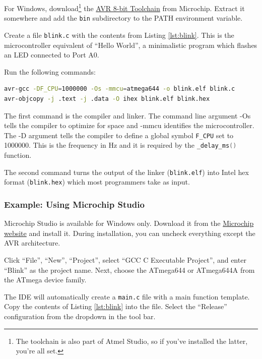 \documentclass{article}
\newcommand{\file}[1]{\texttt{#1}}
\begin{document}
For Windows, download\footnote{The toolchain is also part of Atmel Studio, so if you've installed the latter, you're all set.} the \href{https://www.microchip.com/en-us/tools-resources/develop/microchip-studio/gcc-compilers/}{AVR 8-bit Toolchain} from Microchip. Extract it somewhere and add the \file{bin} subdirectory to the PATH environment variable. 

Create a file \file{blink.c} with the contents from Listing \ref{lst:blink}. This is the microcontroller equivalent of ``Hello World'', a minimalistic program which flashes an LED connected to Port A0. 



Run the following commands:
\begin{lstlisting}[language=bash]
avr-gcc -DF_CPU=1000000 -Os -mmcu=atmega644 -o blink.elf blink.c
avr-objcopy -j .text -j .data -O ihex blink.elf blink.hex
\end{lstlisting}

The first command is the compiler and linker. The command line argument -Os tells the compiler to optimize for space and -mmcu identifies the microcontroller. The -D argument tells the compiler to define a global symbol \lstinline[language=C]{F_CPU} set to 1000000. This is the frequency in Hz and it is required by the \lstinline[language=C]{_delay_ms()} function. 

The second command turns the output of the linker (\file{blink.elf}) into Intel hex format (\file{blink.hex}) which most programmers take as input. 

\subsubsection{Example: Using Microchip Studio}\label{sec:exMchpStudio}
Microchip Studio is available for Windows only. Download it from the \href{https://www.microchip.com/en-us/tools-resources/develop/microchip-studio#Downloads}{Microchip website} and install it. During installation, you can uncheck everything except the AVR architecture. 

Click ``File'', ``New'', ``Project'', select ``GCC C Executable Project'', and enter ``Blink'' as the project name. Next, choose the ATmega644 or ATmega644A from the ATmega device family. 

The IDE will automatically create a \file{main.c} file with a main function template. Copy the contents of Listing \ref{lst:blink} into the file. Select the ``Release'' configuration from the dropdown in the tool bar.  
\end{document}
